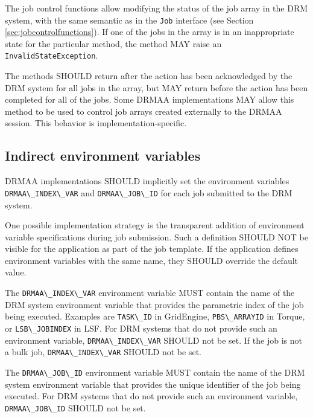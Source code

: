 \documentclass{article}
\newcommand{\h}[1]{\lstinline|#1|}
\newcommand{\rat}[1]{}
\begin{document}
The job control functions allow modifying the status of the job array in the DRM system, with the same semantic as in the \h{Job} interface (see Section \ref{sec:jobcontrolfunctions}). If one of the jobs in the array is in an inappropriate state for the particular method, the method MAY raise an \h{InvalidStateException}.

The methods SHOULD return after the action has been acknowledged by the DRM system for all jobs in the array, but MAY return before the action has been completed for all of the jobs. Some DRMAA implementations MAY allow this method to be used to control job arrays created externally to the DRMAA session. This behavior is implementation-specific.

\rat{We were asked to make explicit that some of these functions may not be atomic. However, this holds for most methods, and is not supported to be a part of the API standard.}

\subsection{Indirect environment variables}
\label{sec:drmaaindex}

DRMAA implementations SHOULD implicitly set the environment variables \h{DRMAA\_INDEX\_VAR} and \h{DRMAA\_JOB\_ID} for each job submitted to the DRM system. 

One possible implementation strategy is the transparent addition of environment variable specifications during job submission. Such a definition SHOULD NOT be visible for the application as part of the job template. If the application defines environment variables with the same name, they SHOULD override the default value. 

The \h{DRMAA\_INDEX\_VAR} environment variable MUST contain the name of the DRM system environment variable that provides the parametric index of the job being executed. Examples are \h{TASK\_ID} in GridEngine, \h{PBS\_ARRAYID} in Torque, or \h{LSB\_JOBINDEX} in LSF. For DRM systems that do not provide such an environment variable,  \h{DRMAA\_INDEX\_VAR} SHOULD not be set. If the job is not a bulk job,  \h{DRMAA\_INDEX\_VAR} SHOULD not be set.

The \h{DRMAA\_JOB\_ID} environment variable MUST contain the name of the DRM system environment variable that provides the unique identifier of the job being executed.  For DRM systems that do not provide such an environment variable,  \h{DRMAA\_JOB\_ID} SHOULD not be set. 
\end{document}

